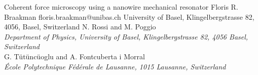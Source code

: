 \begin{conf-abstract}[]
{Coherent force microscopy using a nanowire mechanical resonator}
{\color{blue} Floris R. Braakman}
{floris.braakman@unibas.ch}
{University of Basel, Klingelbergstrasse 82, 4056, Basel, Switzerland}
{{\color{blue}N. Rossi and M. Poggio}\\ \textit{Department of Physics, University of Basel, Klingelbergstrasse 82, 4056 Basel, Switzerland}\\ 
{\color{blue}G. Tütüncüoglu and A. Fontcuberta i Morral}\\ \textit{ École Polytechnique Fédérale de Lausanne, 1015 Lausanne, Switzerland}\\ 
\decofourleft \decofourright}





\printbibliography[heading=none]

\end{conf-abstract}
